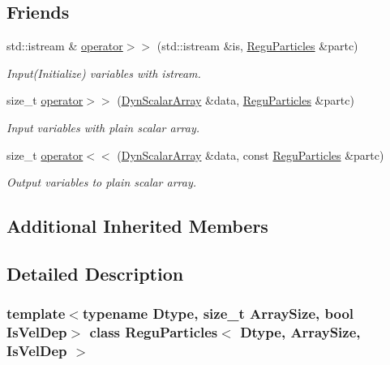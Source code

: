 \subsection*{Friends}
\begin{DoxyCompactItemize}
\item 
std\+::istream \& \mbox{\hyperlink{class_regu_particles_a9a189bff31e696428cec5810b545f050}{operator$>$$>$}} (std\+::istream \&is, \mbox{\hyperlink{class_regu_particles}{Regu\+Particles}} \&partc)
\begin{DoxyCompactList}\small\item\em Input(\+Initialize) variables with istream. \end{DoxyCompactList}\item 
size\+\_\+t \mbox{\hyperlink{class_regu_particles_a1a83dadd99f0bb6d1403b9f163d275cd}{operator$>$$>$}} (\mbox{\hyperlink{class_vel_indep_particles_a6bba8ac3f941a144214037a27ccaa119}{Dyn\+Scalar\+Array}} \&data, \mbox{\hyperlink{class_regu_particles}{Regu\+Particles}} \&partc)
\begin{DoxyCompactList}\small\item\em Input variables with plain scalar array. \end{DoxyCompactList}\item 
size\+\_\+t \mbox{\hyperlink{class_regu_particles_a9c2e33942d0a3b99667c5535bad8f7e9}{operator$<$$<$}} (\mbox{\hyperlink{class_vel_indep_particles_a6bba8ac3f941a144214037a27ccaa119}{Dyn\+Scalar\+Array}} \&data, const \mbox{\hyperlink{class_regu_particles}{Regu\+Particles}} \&partc)
\begin{DoxyCompactList}\small\item\em Output variables to plain scalar array. \end{DoxyCompactList}\end{DoxyCompactItemize}
\subsection*{Additional Inherited Members}


\subsection{Detailed Description}
\subsubsection*{template$<$typename Dtype, size\+\_\+t Array\+Size, bool Is\+Vel\+Dep$>$\newline
class Regu\+Particles$<$ Dtype, Array\+Size, Is\+Vel\+Dep $>$}

